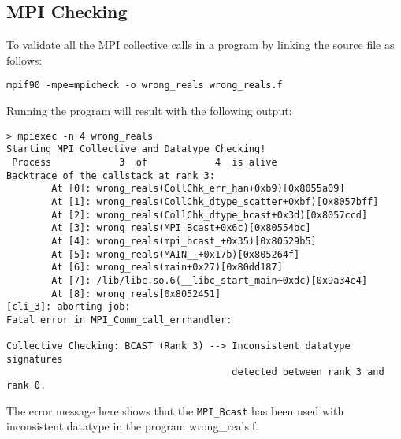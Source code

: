\documentclass[dvipdfm,11pt]{article}
\begin{document}
\subsection{MPI Checking}
\label{sec:mpe_mpicheck}
To validate all the MPI collective calls in a program by
linking the source file as follows:
\begin{verbatim}
mpif90 -mpe=mpicheck -o wrong_reals wrong_reals.f
\end{verbatim}
Running the program will result with the following output:
\begin{verbatim}
> mpiexec -n 4 wrong_reals
Starting MPI Collective and Datatype Checking!
 Process            3  of            4  is alive
Backtrace of the callstack at rank 3:
        At [0]: wrong_reals(CollChk_err_han+0xb9)[0x8055a09]
        At [1]: wrong_reals(CollChk_dtype_scatter+0xbf)[0x8057bff]
        At [2]: wrong_reals(CollChk_dtype_bcast+0x3d)[0x8057ccd]
        At [3]: wrong_reals(MPI_Bcast+0x6c)[0x80554bc]
        At [4]: wrong_reals(mpi_bcast_+0x35)[0x80529b5]
        At [5]: wrong_reals(MAIN__+0x17b)[0x805264f]
        At [6]: wrong_reals(main+0x27)[0x80dd187]
        At [7]: /lib/libc.so.6(__libc_start_main+0xdc)[0x9a34e4]
        At [8]: wrong_reals[0x8052451]
[cli_3]: aborting job:
Fatal error in MPI_Comm_call_errhandler:

Collective Checking: BCAST (Rank 3) --> Inconsistent datatype signatures
                                        detected between rank 3 and rank 0.
\end{verbatim}
The error message here shows that the \texttt{MPI\_Bcast} has been used with
inconsistent datatype in the program wrong\_reals.f.
\end{document}
